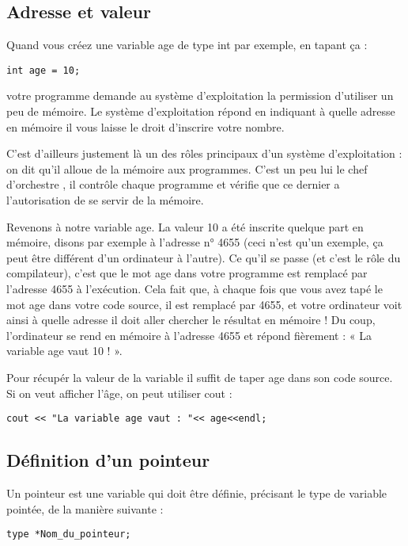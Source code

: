 \documentclass[a4paper, oneside,11pt]{book}
\begin{document}
\subsection{Adresse et valeur}

Quand vous cr\'eez une variable age de type int par exemple, en tapant ça :

\begin{lstlisting}
int age = 10;
\end{lstlisting}


votre programme demande au syst\`eme d'exploitation la permission d'utiliser un peu de m\'emoire. Le syst\`eme d'exploitation r\'epond en indiquant \`a quelle adresse en m\'emoire il 
vous laisse le droit d'inscrire votre nombre.

C'est d'ailleurs justement l\`a un des rôles principaux d'un syst\`eme d'exploitation : on dit qu'il alloue de la m\'emoire aux programmes. C'est un peu lui le chef d'orchestre
, il contrôle chaque programme et v\'erifie que ce dernier a l'autorisation de se servir de la m\'emoire.


Revenons \`a notre variable age. La valeur 10 a \'et\'e inscrite quelque part en m\'emoire, disons par exemple \`a l'adresse n° 4655 (ceci n'est qu'un exemple, \c{c}a peut \^etre diff\'erent
d'un ordinateur \`a l'autre).
Ce qu'il se passe (et c'est le rôle du compilateur), c'est que le mot age dans votre programme est remplac\'e par l'adresse 4655 \`a l'ex\'ecution. Cela fait que, \`a 
chaque fois que vous avez tap\'e le mot age dans votre code source, il est remplac\'e par 4655, et votre ordinateur voit ainsi \`a quelle adresse il doit aller chercher 
le r\'esultat en m\'emoire ! 
Du coup, l'ordinateur se rend en m\'emoire \`a l'adresse 4655 et r\'epond fi\`erement : « La variable age vaut 10 ! ».

Pour r\'ecup\'er la valeur de la variable  il suffit  de taper age dans son code source. Si on veut afficher l'\^age, on peut utiliser cout :

\begin{lstlisting}
cout << "La variable age vaut : "<< age<<endl;
\end{lstlisting}


\subsection{D\'efinition d'un pointeur}

Un pointeur est une variable qui doit \^etre d\'efinie, pr\'ecisant le type de variable point\'ee, de la
mani\`ere suivante :
\begin{lstlisting}
type *Nom_du_pointeur;
\end{lstlisting}
\end{document}
